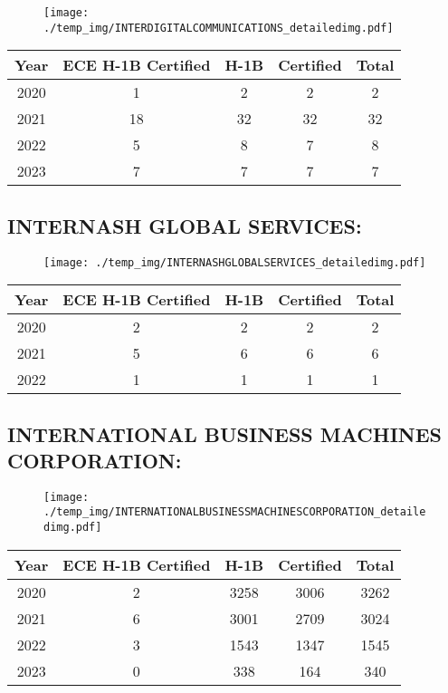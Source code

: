 \documentclass{article}%
\begin{document}
\begin{figure}[htbp]%
\centering%
\texttt{[image: ./temp\_img/INTERDIGITALCOMMUNICATIONS\_detailedimg.pdf]}%
\end{figure}

%
\begin{longtable}{c|c|c|c|c}%
\hline%
Year&ECE H{-}1B Certified&H{-}1B&Certified&Total\\%
\hline%
2020&1&2&2&2\\%
\hline%
2021&18&32&32&32\\%
\hline%
2022&5&8&7&8\\%
\hline%
2023&7&7&7&7\\%
\hline%
\end{longtable}

%
\newpage%
\subsection{INTERNASH GLOBAL SERVICES:}%
\label{subsec:INTERNASHGLOBALSERVICES}%
\label{INTERNASHGLOBALSERVICESdetailed}%


\begin{figure}[htbp]%
\centering%
\texttt{[image: ./temp\_img/INTERNASHGLOBALSERVICES\_detailedimg.pdf]}%
\end{figure}

%
\begin{longtable}{c|c|c|c|c}%
\hline%
Year&ECE H{-}1B Certified&H{-}1B&Certified&Total\\%
\hline%
2020&2&2&2&2\\%
\hline%
2021&5&6&6&6\\%
\hline%
2022&1&1&1&1\\%
\hline%
\end{longtable}

%
\newpage%
\subsection{INTERNATIONAL BUSINESS MACHINES CORPORATION:}%
\label{subsec:INTERNATIONALBUSINESSMACHINESCORPORATION}%
\label{INTERNATIONALBUSINESSMACHINESCORPORATIONdetailed}%


\begin{figure}[htbp]%
\centering%
\texttt{[image: ./temp\_img/INTERNATIONALBUSINESSMACHINESCORPORATION\_detailedimg.pdf]}%
\end{figure}

%
\begin{longtable}{c|c|c|c|c}%
\hline%
Year&ECE H{-}1B Certified&H{-}1B&Certified&Total\\%
\hline%
2020&2&3258&3006&3262\\%
\hline%
2021&6&3001&2709&3024\\%
\hline%
2022&3&1543&1347&1545\\%
\hline%
2023&0&338&164&340\\%
\hline%
\end{longtable}
\end{document}
